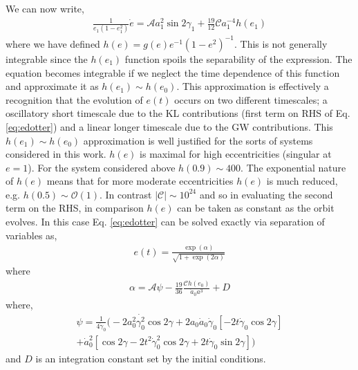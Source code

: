 \documentclass[a4paper,fleqn,usenatbib]{mnras}
\begin{document}
\noindent We can now write,
\begin{eqnarray}
\frac{1}{e_1(1-e_1^2)}\dot{e} = \mathcal{A} a_1^2 \sin 2 \gamma_{1} + \frac{19}{12} \mathcal{C} a_1^{-4} h(e_1)
\label{eq:edotter}
\end{eqnarray}
where  we have defined  $h(e) = g(e) e^{-1} (1-e^2)^{-1}$.  This is not generally integrable since the $h(e_1)$ function spoils the separability of the expression. The equation becomes integrable if we neglect the time dependence of this function and approximate it as $h(e_1) \sim h(e_0)$. This approximation is effectively a recognition that the evolution of $e(t)$ occurs on two different timescales; a oscillatory short timescale due to the KL contributions (first term on RHS of Eq. \ref{eq:edotter}) and a linear longer timescale due to the GW contributions. This $h(e_1) \sim h(e_0)$ approximation is well justified for the sorts of systems considered in this work. $h(e)$ is maximal for high eccentricities (singular at $e=1$). For the system considered above $h(0.9) \sim 400$. The exponential nature of $h(e)$ means that for more moderate eccentricities $h(e)$ is much reduced, e.g. $ h(0.5) \sim \mathcal{O} (1)$. In contrast $|\mathcal{C}| \sim 10^{24}$ and so in evaluating the second term on the RHS, in comparison $h(e)$ can be taken as constant as the orbit evolves. In this case Eq. \ref{eq:edotter} can be solved exactly via separation of variables as, 
\begin{eqnarray}
e(t) = \frac{\exp (\alpha)}{\sqrt{1 + \exp (2 \alpha)}}
\end{eqnarray}
where 
\begin{eqnarray}
\alpha = \mathcal{A} \psi - \frac{19}{36} \frac{\mathcal{C} h(e_0)}{\dot{a}_0 a^3} + D
\end{eqnarray}
where,
\begin{align}
\psi = \frac{1}{4 \dot{\gamma}_0} \Bigg ( - 2a_0^2 \dot{\gamma_0^2} \cos2 \gamma + 2 a_0 \dot{a}_0 \dot{\gamma}_0 \left[-2t \dot{\gamma}_0 \cos 2 \gamma \right] \\
+ \dot{a}_0^2 \left[\cos 2 \gamma - 2t^2 \dot{\gamma}_0^2 \cos 2 \gamma + 2 t \dot{\gamma}_0 \sin 2 \gamma \right] \Bigg )
\end{align}
and $D$ is an integration constant set by the initial conditions.
\end{document}
